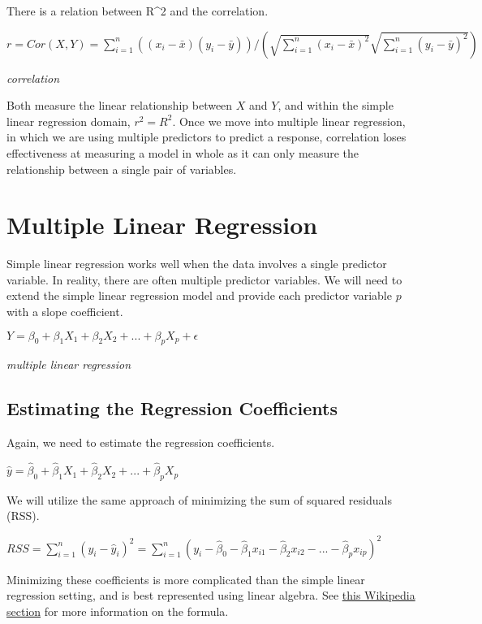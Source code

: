 \documentclass[]{book}
\begin{document}
There is a relation between R\^{}2 and the correlation.

\(r = Cor(X,Y) = \sum_{i=1}^{n}((x_i-\bar x)(y_i - \bar y))/(\sqrt{\sum_{i=1}^{n}(x_i - \bar x)^2}\sqrt{\sum_{i=1}^{n}(y_i - \bar y)^2})\)

\emph{correlation}

Both measure the linear relationship between \(X\) and \(Y\), and within the simple linear regression domain, \(r^2 = R^2\). Once we move into multiple linear regression, in which we are using multiple predictors to predict a response, correlation loses effectiveness at measuring a model in whole as it can only measure the relationship between a single pair of variables.

\hypertarget{multiple-linear-regression}{%
\section{Multiple Linear Regression}\label{multiple-linear-regression}}

Simple linear regression works well when the data involves a single predictor variable. In reality, there are often multiple predictor variables. We will need to extend the simple linear regression model and provide each predictor variable \(p\) with a slope coefficient.

\(Y = \beta_0 + \beta_1X_1 + \beta_2X_2 + ... + \beta_pX_p + \epsilon\)

\emph{multiple linear regression}

\hypertarget{estimating-the-regression-coefficients}{%
\subsection{Estimating the Regression Coefficients}\label{estimating-the-regression-coefficients}}

Again, we need to estimate the regression coefficients.

\(\hat y = \hat\beta_0 + \hat\beta_1X_1 + \hat\beta_2X_2 + ... + \hat\beta_pX_p\)

We will utilize the same approach of minimizing the sum of squared residuals (RSS).

\(RSS = \sum_{i=1}^{n}(y_i - \hat y_i)^2 = \sum_{i=1}^{n}(y_i - \hat\beta_0 - \hat\beta_1x_{i1} - \hat\beta_2x_{i2} - ... - \hat\beta_px_{ip})^2\)

Minimizing these coefficients is more complicated than the simple linear regression setting, and is best represented using linear algebra. See \href{https://en.wikipedia.org/wiki/Residual_sum_of_squares\#Matrix_expression_for_the_OLS_residual_sum_of_squares}{this Wikipedia section} for more information on the formula.
\end{document}
